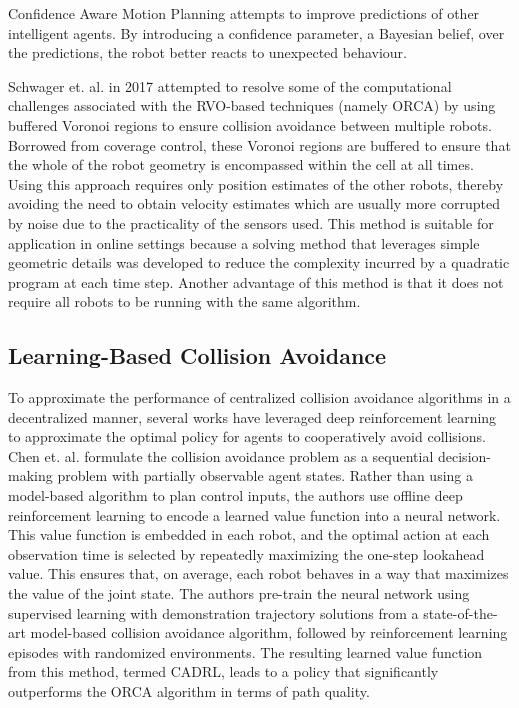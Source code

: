 \documentclass[conference]{IEEEtran}
\begin{document}
Confidence Aware Motion Planning \cite{fridovich2020confidence} attempts to improve predictions of other intelligent agents. By introducing a confidence parameter, a Bayesian belief, over the predictions, the robot better reacts to unexpected behaviour.

Schwager et. al. in 2017 \cite{schwager2017} attempted to resolve some of the computational challenges associated with the RVO-based techniques (namely ORCA) by using buffered Voronoi regions to ensure collision avoidance between multiple robots. Borrowed from coverage control, these Voronoi regions are buffered to ensure that the whole of the robot geometry is encompassed within the cell at all times. Using this approach requires only position estimates of the other robots, thereby avoiding the need to obtain velocity estimates which are usually more corrupted by noise due to the practicality of the sensors used. This method is suitable for application in online settings because a solving method that leverages simple geometric details was developed to reduce the complexity incurred by a quadratic program at each time step. Another advantage of this method is that it does not require all robots to be running with the same algorithm.

\subsection{Learning-Based Collision Avoidance}
To approximate the performance of centralized collision avoidance algorithms in a decentralized manner, several works have leveraged deep reinforcement learning to approximate the optimal policy for agents to cooperatively avoid collisions. Chen et. al. \cite{chen2017cadrl} formulate the collision avoidance problem as a sequential decision-making problem with partially observable agent states. Rather than using a model-based algorithm to plan control inputs, the authors use offline deep reinforcement learning to encode a learned value function into a neural network. This value function is embedded in each robot, and the optimal action at each observation time is selected by repeatedly maximizing the one-step lookahead value. This ensures that, on average, each robot behaves in a way that maximizes the value of the joint state. The authors pre-train the neural network using supervised learning with demonstration trajectory solutions from a state-of-the-art model-based collision avoidance algorithm, followed by reinforcement learning episodes with randomized environments. The resulting learned value function from this method, termed CADRL, leads to a policy that significantly outperforms the ORCA algorithm in terms of path quality.
\end{document}
